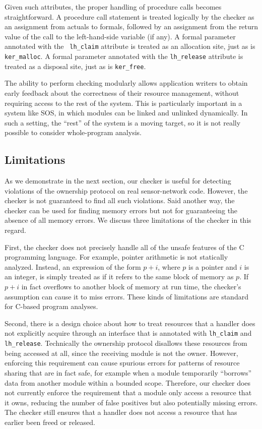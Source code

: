 Given such attributes, the proper handling of procedure calls becomes
straightforward.  A procedure call statement is treated logically by
the checker as an assignment from actuals to formals, followed by an
assignment from the return value of the call to the left-hand-side
variable (if any).  A formal parameter annotated with the {\tt
lh\_claim} attribute is treated as an allocation site, just as is {\tt
ker\_malloc}.  A formal parameter annotated with the {\tt lh\_release}
attribute is treated as a disposal site, just as is {\tt ker\_free}.

The ability to perform checking modularly allows application writers
to obtain early feedback about the correctness of their resource
management, without requiring access to the rest of the system.  This
is particularly important in a system like SOS, in which modules can
be linked and unlinked dynamically.  In such a setting, the ``rest''
of the system is a moving target, so it is not really possible to
consider whole-program analysis.


\subsection{Limitations}

As we demonstrate in the next section, our checker is useful for
detecting violations of the ownership protocol on real sensor-network
code.  However, the checker is not guaranteed to find all such
violations.  Said another way, the checker can be used for finding
memory errors but not for guaranteeing the absence of all memory
errors.  We discuss three limitations of the checker in this regard.

First, the checker does not precisely handle all of the unsafe
features of the C programming language.  For example, pointer
arithmetic is not statically analyzed.  Instead, an expression of the
form $p+i$, where $p$ is a pointer and $i$ is an integer, is simply
treated as if it refers to the same block of memory as $p$.  If $p+i$
in fact overflows to another block of memory at run time, the
checker's assumption can cause it to miss errors.  These kinds of
limitations are standard for C-based program analyses.

Second, there is a design choice about how to treat resources that a
handler does not explicitly acquire through an interface that is
annotated with {\tt lh\_claim} and {\tt lh\_release}.  Technically the
ownership protocol disallows these resources from being accessed at
all, since the receiving module is not the owner.  However, enforcing
this requirement can cause spurious errors for patterns of resource
sharing that are in fact safe, for example when a module temporarily
``borrows'' data from another module within a bounded scope.
Therefore, our checker does not currently enforce the requirement that
a module only access a resource that it owns, reducing the number of
false positives but also potentially missing errors.  The checker
still ensures that a handler does not access a resource that has
earlier been freed or released.

